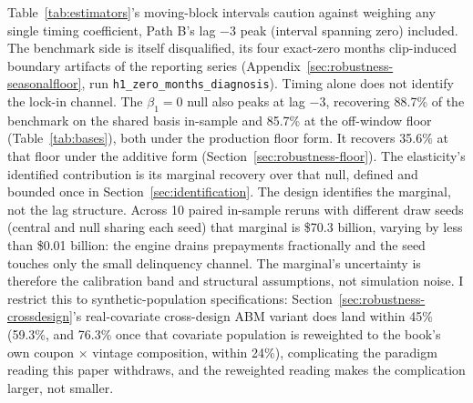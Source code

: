 \documentclass[12pt]{article}
\begin{document}
Table~\ref{tab:estimators}'s moving-block intervals caution against weighing any single timing coefficient, Path B's lag $-3$ peak (interval spanning zero) included. The benchmark side is itself disqualified, its four exact-zero months clip-induced boundary artifacts of the reporting series (Appendix~\ref{sec:robustness-seasonalfloor}, run \texttt{h1\_zero\_months\_diagnosis}). Timing alone does not identify the lock-in channel. The $\beta_1 = 0$ null also peaks at lag $-3$, recovering 88.7\% of the benchmark on the shared basis in-sample and 85.7\% at the off-window floor (Table~\ref{tab:bases}), both under the production floor form. It recovers 35.6\% at that floor under the additive form (Section~\ref{sec:robustness-floor}). The elasticity's identified contribution is its marginal recovery over that null, defined and bounded once in Section~\ref{sec:identification}. The design identifies the marginal, not the lag structure. Across 10 paired in-sample reruns with different draw seeds (central and null sharing each seed) that marginal is \$70.3 billion, varying by less than \$0.01 billion: the engine drains prepayments fractionally and the seed touches only the small delinquency channel. The marginal's uncertainty is therefore the calibration band and structural assumptions, not simulation noise. I restrict this to synthetic-population specifications: Section~\ref{sec:robustness-crossdesign}'s real-covariate cross-design ABM variant does land within 45\% (59.3\%, and 76.3\% once that covariate population is reweighted to the book's own coupon $\times$ vintage composition, within 24\%), complicating the paradigm reading this paper withdraws, and the reweighted reading makes the complication larger, not smaller.
\end{document}
